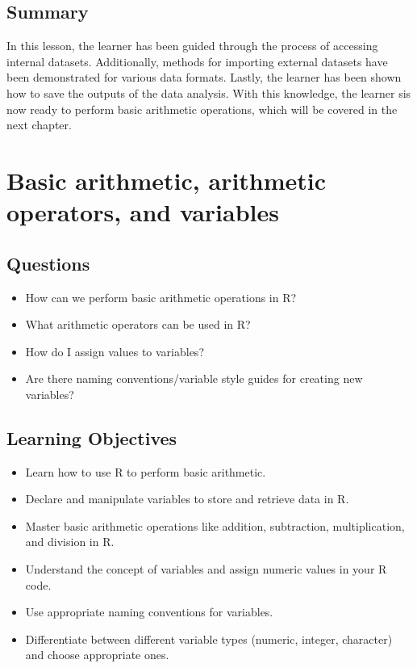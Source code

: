 \documentclass[
  letterpaper,
  DIV=11,
  numbers=noendperiod]{scrreprt}
\begin{document}
\section{Summary}\label{summary-4}

In this lesson, the learner has been guided through the process of
accessing internal datasets. Additionally, methods for importing
external datasets have been demonstrated for various data formats.
Lastly, the learner has been shown how to save the outputs of the data
analysis. With this knowledge, the learner sis now ready to perform
basic arithmetic operations, which will be covered in the next chapter.


\chapter{Basic arithmetic, arithmetic operators, and
variables}\label{sec-arithmetic-variables}

\section{Questions}\label{questions-5}

\begin{itemize}
\item
  How can we perform basic arithmetic operations in R?
\item
  What arithmetic operators can be used in R?
\item
  How do I assign values to variables?
\item
  Are there naming conventions/variable style guides for creating new
  variables?
\end{itemize}

\section{Learning Objectives}\label{learning-objectives-5}

\begin{itemize}
\item
  Learn how to use R to perform basic arithmetic.
\item
  Declare and manipulate variables to store and retrieve data in R.
\item
  Master basic arithmetic operations like addition, subtraction,
  multiplication, and division in R.
\item
  Understand the concept of variables and assign numeric values in your
  R code.
\item
  Use appropriate naming conventions for variables.
\item
  Differentiate between different variable types (numeric, integer,
  character) and choose appropriate ones.
\end{itemize}
\end{document}
